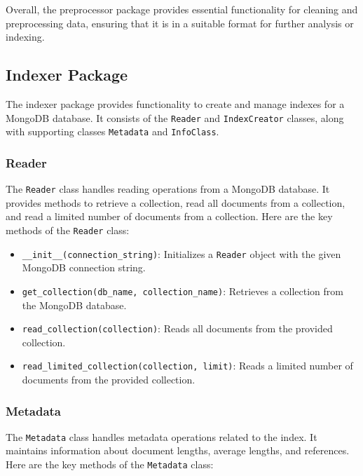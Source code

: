 \documentclass{article}
\begin{document}
Overall, the preprocessor package provides essential functionality for cleaning and 
preprocessing data, ensuring that it is in a suitable format for further analysis or indexing.

\subsection{Indexer Package}

The indexer package provides functionality to create and manage indexes for a MongoDB database. 
It consists of the \texttt{Reader} and \texttt{IndexCreator} classes, along with supporting 
classes \texttt{Metadata} and \texttt{InfoClass}.

\subsubsection{Reader}

The \texttt{Reader} class handles reading operations from a MongoDB database. It provides 
methods to retrieve a collection, read all documents from a collection, and read a limited 
number of documents from a collection. Here are the key methods of the \texttt{Reader} class:

\begin{itemize}
    \item \texttt{\_\_init\_\_(connection\_string)}: Initializes a \texttt{Reader} object with 
    the given MongoDB connection string.
    \item \texttt{get\_collection(db\_name, collection\_name)}: Retrieves a collection from the 
    MongoDB database.
    \item \texttt{read\_collection(collection)}: Reads all documents from the provided 
    collection.
    \item \texttt{read\_limited\_collection(collection, limit)}: Reads a limited number of 
    documents from the provided collection.
\end{itemize}

\subsubsection{Metadata}

The \texttt{Metadata} class handles metadata operations related to the index. It maintains 
information about document lengths, average lengths, and references. Here are the key methods of 
the \texttt{Metadata} class:
\end{document}
